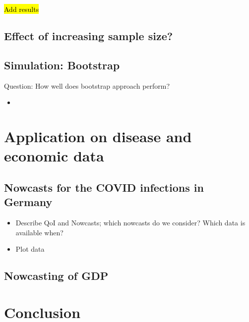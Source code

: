 \documentclass[oneside]{article}
\theoremstyle{plain}%
\theoremstyle{definition}
\begin{document}
\hl{Add results}

\subsection{Effect of increasing sample size?}

\subsection{Simulation: Bootstrap}

Question: How well does bootstrap approach perform?

\begin{itemize}
  \item 
\end{itemize}


\section{Application on disease and economic data}

\subsection{Nowcasts for the COVID infections in Germany}

\begin{itemize}
  \item Describe QoI and Nowcasts; which nowcasts do we consider? Which data is available when?
  \item Plot data
\end{itemize}

\subsection{Nowcasting of GDP}

\section{Conclusion}
\end{document}
